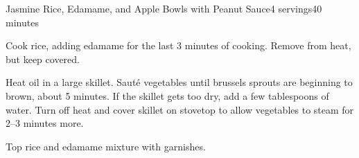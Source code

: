 \documentclass[../Cookbook.tex]{subfiles}
\begin{document}
\begin{recipe}{Jasmine Rice, Edamame, and Apple Bowls with Peanut Sauce}{4 servings}{40 minutes}

Cook rice, adding edamame for the last 3 minutes of cooking. Remove from heat, but keep covered.

Heat oil in a large skillet. Saut\'e vegetables until brussels sprouts are beginning to brown, about 5 minutes. If the skillet gets too dry, add a few tablespoons of water. Turn off heat and cover skillet on stovetop to allow vegetables to steam for 2--3 minutes more.

Top rice and edamame mixture with garnishes.

\end{recipe}
\end{document}
